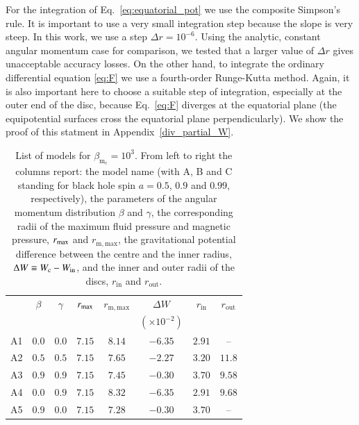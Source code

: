 \documentclass[referee]{aa}
\begin{document}
For the integration of Eq.~\eqref{eq:equatorial_pot} we use the composite Simpson's rule. It is important to use a very small integration step because the slope is very steep. In this work, we use a step $\Delta r = 10^{-6}$. Using the analytic, constant angular momentum case for comparison, we tested that 
a larger value of $\Delta r$ gives unacceptable accuracy losses. On the other hand, to integrate the ordinary differential equation \eqref{eq:F} we use a fourth-order Runge-Kutta method. Again, it is also important here to choose a suitable step of integration, especially at the outer end of the disc, because Eq.~\eqref{eq:F} diverges at the equatorial plane (the equipotential surfaces cross the equatorial plane perpendicularly). We show the proof of this statment in Appendix~\ref{div_partial_W}.

\begin{table}
\caption{List of models for $\beta_{\mathrm{m}_{\mathrm{c}}} = 10^{3}$. From left to right the columns report: the model name (with A, B and C standing for black hole spin $a = 0.5$, $0.9$ and $0.99$, respectively), the parameters of the angular momentum distribution $\beta$ and $\gamma$, the corresponding radii of the maximum fluid pressure and magnetic pressure, $r_{{\rm{max}}}$ and $r_{{\mathrm{m, max}}}$, the gravitational potential difference between the centre and the inner radius, $\Delta W\equiv W_{\rm c}-W_{\rm in}$, and the inner and outer radii of the discs, $r_{\mathrm{in}}$ and $r_{\mathrm{out}}$.}             
\label{table:1}      
\centering          
\begin{tabular}{c c c c  c c c c}
\hline\hline       
 & $\beta$ & $\gamma$ & $r_{\rm{max}}$ &  $r_{\mathrm{m, max}}$ & $\Delta W$               & $r_{\mathrm{in}}$ & $r_{\mathrm{out}}$ \\ 
 &              &                   &                          &                                        & $(\times 10^{-2})$     &                              &  \\
\hline           
A1 & $0.0$ & $0.0$ & $7.15$ &  $8.14$  & $-6.35$ & $2.91$ & -- \\ 
A2 & $0.5$ & $0.5$ & $7.15$ &  $7.65$  & $-2.27$ & $3.20$ & $11.8$\\ 
A3 & $0.9$ & $0.9$ & $7.15$ &  $7.45$  & $-0.30$ & $3.70$ &  $9.58$\\ 
A4 & $0.0$ & $0.9$ & $7.15$ &  $8.32$  & $-6.35$ & $2.91$ & $9.68$\\ 
A5 & $0.9$ & $0.0$ & $7.15$ &  $7.28$  & $-0.30$ & $3.70$ & --\\ 

\end{tabular}
\end{table}
\end{document}
